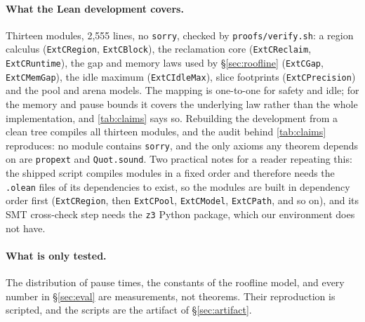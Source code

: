 \paragraph{What the Lean development covers.}
Thirteen modules, 2,555 lines, no \texttt{sorry}, checked by \texttt{proofs/verify.sh}: a region
calculus (\texttt{ExtCRegion}, \texttt{ExtCBlock}), the reclamation core
(\texttt{ExtCReclaim}, \texttt{ExtCRuntime}), the gap and memory laws used by
\S\ref{sec:roofline} (\texttt{ExtCGap}, \texttt{ExtCMemGap}), the idle maximum
(\texttt{ExtCIdleMax}), slice footprints (\texttt{ExtCPrecision}) and the pool and arena models.
The mapping is one-to-one for safety and idle; for the memory and pause bounds it covers the
underlying law rather than the whole implementation, and \tab\ref{tab:claims} says so.
Rebuilding the development from a clean tree compiles all thirteen modules, and the audit behind
\tab\ref{tab:claims} reproduces: no module contains \texttt{sorry}, and the only axioms any theorem
depends on are \texttt{propext} and \texttt{Quot.sound}.  Two practical notes for a reader repeating
this: the shipped script compiles modules in a fixed order and therefore needs the \texttt{.olean}
files of its dependencies to exist, so the modules are built in dependency order first
(\texttt{ExtCRegion}, then \texttt{ExtCPool}, \texttt{ExtCModel}, \texttt{ExtCPath}, and so on), and
its SMT cross-check step needs the \texttt{z3} Python package, which our environment does not have.

\paragraph{What is only tested.}
The distribution of pause times, the constants of the roofline model, and every number in
\S\ref{sec:eval} are measurements, not theorems.
Their reproduction is scripted, and the scripts are the artifact of \S\ref{sec:artifact}.
